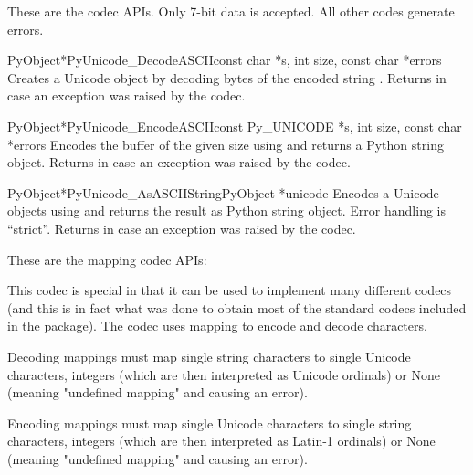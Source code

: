 \documentclass{manual}
\begin{document}

These are the \ASCII{} codec APIs.  Only 7-bit \ASCII{} data is
accepted. All other codes generate errors.

\begin{cfuncdesc}{PyObject*}{PyUnicode_DecodeASCII}{const char *s,
                                                    int size,
                                                    const char *errors}
Creates a Unicode object by decoding  bytes of the
\ASCII{} encoded string . Returns \NULL{} in case an exception
was raised by the codec.
\end{cfuncdesc}

\begin{cfuncdesc}{PyObject*}{PyUnicode_EncodeASCII}{const Py_UNICODE *s,
                                                    int size,
                                                    const char *errors}
Encodes the  buffer of the given size using
\ASCII{} and returns a Python string object.  Returns \NULL{} in case
an exception was raised by the codec.
\end{cfuncdesc}

\begin{cfuncdesc}{PyObject*}{PyUnicode_AsASCIIString}{PyObject *unicode}
Encodes a Unicode objects using \ASCII{} and returns the result as Python
string object. Error handling is ``strict''. Returns
\NULL{} in case an exception was raised by the codec.
\end{cfuncdesc}


These are the mapping codec APIs:

This codec is special in that it can be used to implement many
different codecs (and this is in fact what was done to obtain most of
the standard codecs included in the  package). The
codec uses mapping to encode and decode characters.

Decoding mappings must map single string characters to single Unicode
characters, integers (which are then interpreted as Unicode ordinals)
or None (meaning "undefined mapping" and causing an error). 

Encoding mappings must map single Unicode characters to single string
characters, integers (which are then interpreted as Latin-1 ordinals)
or None (meaning "undefined mapping" and causing an error).
\end{document}
